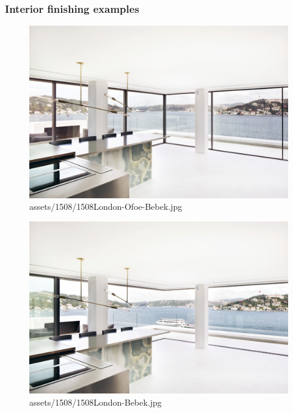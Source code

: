 \documentclass[
]{article}
\begin{document}
\subsubsection{Interior finishing
examples}\label{interior-finishing-examples}

\begin{figure}[H]

{\centering \includegraphics{assets/1508/1508London-Ofoe-Bebek.jpg}

}

\caption{assets/1508/1508London-Ofoe-Bebek.jpg}

\end{figure}%
\begin{figure}[H]

{\centering \includegraphics{assets/1508/1508London-Bebek.jpg}

}

\caption{assets/1508/1508London-Bebek.jpg}

\end{figure}%
\end{document}

